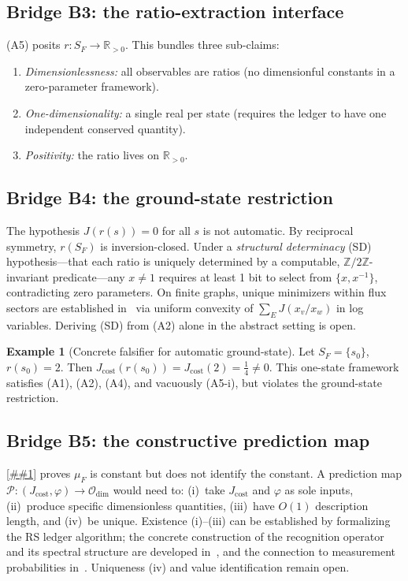 \documentclass[11pt]{article}
\providecommand{\Cref}[1]{\ref{##1}}%
\newcommand{\Rp}{\mathbb{R}_{>0}}
\newcommand{\Jcost}{J_{\mathrm{cost}}}
\newcommand{\Odim}{\mathcal{O}_{\mathrm{dim}}}
\theoremstyle{definition}
\newtheorem{example}[theorem]{Example}
\theoremstyle{remark}
\begin{document}
\subsection{Bridge B3: the ratio-extraction interface}
\label{sec:bridge-b3}

(A5) posits $r : S_F \to \Rp$.
This bundles three sub-claims:
\begin{enumerate}
\item \emph{Dimensionlessness:} all observables are ratios
  (no dimensionful constants in a zero-parameter framework).
\item \emph{One-dimensionality:} a single real per state
  (requires the ledger to have one independent conserved
  quantity).
\item \emph{Positivity:} the ratio lives on $\Rp$.
\end{enumerate}

\subsection{Bridge B4: the ground-state restriction}
\label{sec:bridge-b4}

The hypothesis $J(r(s)) = 0$ for all $s$ is not automatic.
By reciprocal symmetry, $r(S_F)$ is inversion-closed.
Under a \emph{structural determinacy} (SD) hypothesis---that
each ratio is uniquely determined by a computable,
$\mathbb{Z}/2\mathbb{Z}$-invariant predicate---any $x \neq 1$
requires at least 1 bit to select from $\{x, x^{-1}\}$,
contradicting zero parameters.
On finite graphs, unique minimizers within flux sectors are
established in~\cite{GCIC2026} via uniform convexity of
$\sum_E J(x_v / x_w)$ in log variables.
Deriving (SD) from (A2) alone in the abstract setting is open.

\begin{example}[Concrete falsifier for automatic ground-state]
Let $S_F = \{s_0\}$, $r(s_0) = 2$.
Then $\Jcost(r(s_0)) = \Jcost(2) = \frac{1}{4} \neq 0$.
This one-state framework satisfies (A1), (A2), (A4), and
vacuously (A5-i), but violates the ground-state restriction.
\end{example}

\subsection{Bridge B5: the constructive prediction map}
\label{sec:bridge-b5}

\Cref{thm:main} proves $\mu_F$ is constant but does not identify
the constant.
A prediction map
$\mathcal{P} : (\Jcost, \varphi) \to \Odim$ would need to:
(i)~take $\Jcost$ and $\varphi$ as sole inputs,
(ii)~produce specific dimensionless quantities,
(iii)~have $O(1)$ description length, and
(iv)~be unique.
Existence (i)--(iii) can be established by formalizing the RS
ledger algorithm; the concrete construction of the recognition
operator and its spectral structure are developed
in~\cite{RecogOp2026}, and the connection to measurement
probabilities in~\cite{BornRule2026}.
Uniqueness (iv) and value identification remain open.
\end{document}
